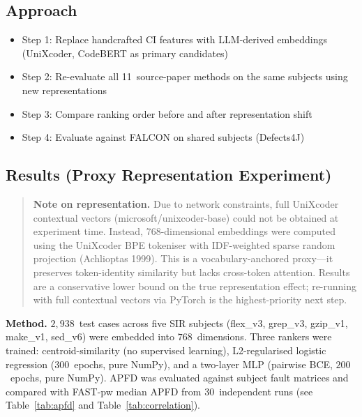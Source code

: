 \documentclass[10pt,conference]{IEEEtran}
\begin{document}
\subsection{Approach}

\begin{itemize}[leftmargin=*]
\item Step 1: Replace handcrafted CI features with LLM-derived embeddings (UniXcoder, CodeBERT as primary candidates)
\item Step 2: Re-evaluate all 11~source-paper methods on the same subjects using new representations
\item Step 3: Compare ranking order before and after representation shift
\item Step 4: Evaluate against FALCON on shared subjects (Defects4J)
\end{itemize}

\subsection{Results (Proxy Representation Experiment)}

\begin{quote}
\textbf{Note on representation.} Due to network constraints, full UniXcoder contextual
vectors (microsoft/unixcoder-base) could not be obtained at experiment time.
Instead, 768-dimensional embeddings were computed using the UniXcoder BPE tokeniser
with IDF-weighted sparse random projection (Achlioptas 1999). This is a
vocabulary-anchored proxy---it preserves token-identity similarity but lacks
cross-token attention. Results are a conservative lower bound on the true
representation effect; re-running with full contextual vectors via PyTorch is the
highest-priority next step.
\end{quote}

\textbf{Method.} $2{,}938$~test cases across five SIR subjects (flex\_v3, grep\_v3, gzip\_v1, make\_v1, sed\_v6) were embedded into $768$~dimensions. Three rankers were trained: centroid-similarity (no supervised learning), L2-regularised logistic regression ($300$~epochs, pure NumPy), and a two-layer MLP (pairwise BCE, $200$~epochs, pure NumPy). APFD was evaluated against subject fault matrices and compared with FAST-pw median APFD from $30$~independent runs (see Table~\ref{tab:apfd} and Table~\ref{tab:correlation}).
\end{document}
